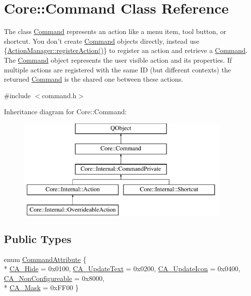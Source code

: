 \hypertarget{class_core_1_1_command}{\section{Core\-:\-:Command Class Reference}
\label{class_core_1_1_command}
}


The class \hyperlink{class_core_1_1_command}{Command} represents an action like a menu item, tool button, or shortcut. You don't create \hyperlink{class_core_1_1_command}{Command} objects directly, instead use \{\hyperlink{group___core_plugin_ga316dd0cff29b294cd1b0631677f6357d}{Action\-Manager\-::register\-Action()}\} to register an action and retrieve a \hyperlink{class_core_1_1_command}{Command}. The \hyperlink{class_core_1_1_command}{Command} object represents the user visible action and its properties. If multiple actions are registered with the same I\-D (but different contexts) the returned \hyperlink{class_core_1_1_command}{Command} is the shared one between these actions.  




{\ttfamily \#include $<$command.\-h$>$}

Inheritance diagram for Core\-:\-:Command\-:\begin{figure}[H]
\begin{center}
\leavevmode
\includegraphics[height=5.000000cm]{class_core_1_1_command}
\end{center}
\end{figure}
\subsection*{Public Types}
\begin{DoxyCompactItemize}
\item 
enum \hyperlink{group___core_plugin_ga4d899c1f711159a432afeab3eb78c917}{Command\-Attribute} \{ \\*
\hyperlink{group___core_plugin_gga4d899c1f711159a432afeab3eb78c917ab40bdce625687830fbabbab74f3566f0}{C\-A\-\_\-\-Hide} = 0x0100, 
\hyperlink{group___core_plugin_gga4d899c1f711159a432afeab3eb78c917a458aeb773c85933e0dd3e1bbf5a4243c}{C\-A\-\_\-\-Update\-Text} = 0x0200, 
\hyperlink{group___core_plugin_gga4d899c1f711159a432afeab3eb78c917a838b5063e78a4f22a5aa7fa17c7f9358}{C\-A\-\_\-\-Update\-Icon} = 0x0400, 
\hyperlink{group___core_plugin_gga4d899c1f711159a432afeab3eb78c917aba521f39f43b4328b76f678656a12d36}{C\-A\-\_\-\-Non\-Configureable} = 0x8000, 
\\*
\hyperlink{group___core_plugin_gga4d899c1f711159a432afeab3eb78c917af24dbbade51b0afabda629e630197657}{C\-A\-\_\-\-Mask} = 0x\-F\-F00
 \}
\end{DoxyCompactItemize}
